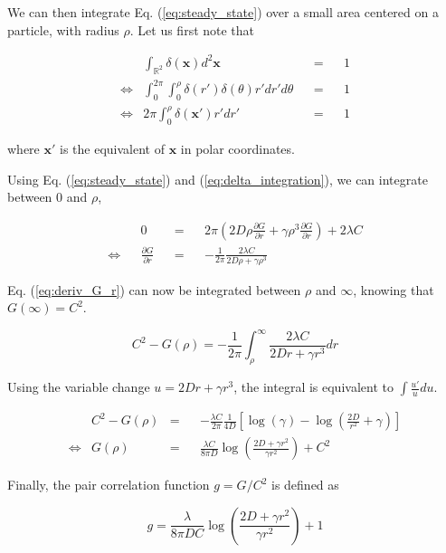 We can then integrate Eq. (\ref{eq:steady_state}) over a small
area centered on a particle, with radius $\rho$. Let us first note
that

\begin{align}
& \int_{\mathbb{R}^{2}}\delta(\boldsymbol{x})d^{2}\boldsymbol{x} & & = & & 1\nonumber \\
\Leftrightarrow & \int_{0}^{2\pi}\int_{0}^{\rho}\delta(r')\delta(\theta)r'dr'd\theta & & = & & 1\nonumber \\
\Leftrightarrow & 2\pi\int_{0}^{\rho}\delta(\boldsymbol{x'})r'dr' & & = & & 1\label{eq:delta_integration}
\end{align}

where $\boldsymbol{x'}$ is the equivalent of $\boldsymbol{x}$ in polar coordinates. 

Using Eq. (\ref{eq:steady_state}) and (\ref{eq:delta_integration}),
we can integrate between 0 and $\rho$, 

\begin{align}
 & & 0 & & = & & 2\pi\left(2D\rho\frac{\partial G}{\partial r}+\gamma\rho^{3}\frac{\partial G}{\partial r}\right)+2\lambda C\nonumber \\
\Leftrightarrow & & \frac{\partial G}{\partial r} & & = & & -\frac{1}{2\pi}\frac{2\lambda C}{2D\rho+\gamma\rho^{3}}\label{eq:deriv_G_r}
\end{align}

Eq. (\ref{eq:deriv_G_r}) can now be integrated between $\rho$ and $\infty$, knowing that $G(\infty)=C^{2}.$

\begin{equation}
 C^{2}-G(\rho) = -\frac{1}{2\pi}{\displaystyle \int_{\rho}^{\infty}}\frac{2\lambda C}{2Dr+\gamma r^{3}}dr\label{eq:deriv_G_r_int1}
\end{equation}

Using the variable change $u=2Dr+\gamma r^{3}$, the integral is equivalent
to $\int\frac{u'}{u}du$.

\begin{align}
 & C^{2}-G(\rho) & = & & -\frac{\lambda C}{2\pi}\frac{1}{4D}[\log(\gamma)-\log(\frac{2D}{r^{2}}+\gamma)]\label{eq:deriv_G_rint2}\\
\Leftrightarrow & G(\rho) & = & & \frac{\lambda C}{8\pi D}\log\left(\frac{2D+\gamma r^{2}}{\gamma r^{2}}\right)+C^{2}\label{eq:G_rho}
\end{align}

Finally, the pair correlation function $g=G/C^{2}$ is defined as

\begin{equation}
g=\frac{\lambda}{8\pi DC}\log\left(\frac{2D+\gamma r^{2}}{\gamma r^{2}}\right)+1
\end{equation}


